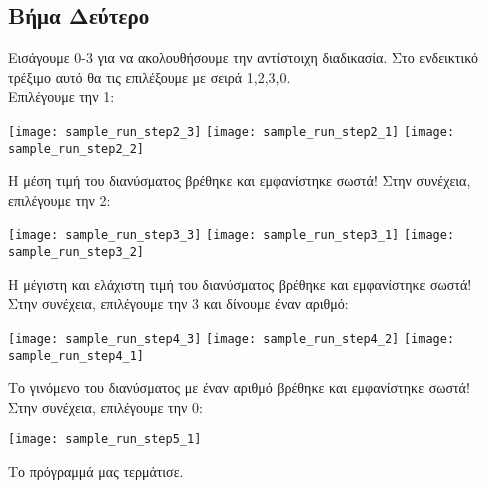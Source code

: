 \subsection{Βήμα Δεύτερο}
Εισάγουμε 0-3 για να ακολουθήσουμε την αντίστοιχη διαδικασία.
Στο ενδεικτικό τρέξιμο αυτό θα τις επιλέξουμε με σειρά 1,2,3,0.
\\
Επιλέγουμε την 1:
\begin{center}
\texttt{[image: sample\_run\_step2\_3]}
\texttt{[image: sample\_run\_step2\_1]}
\texttt{[image: sample\_run\_step2\_2]}
\end{center}
Η μέση τιμή του διανύσματος βρέθηκε και εμφανίστηκε σωστά!
Στην συνέχεια, επιλέγουμε την 2:
\begin{center}
\texttt{[image: sample\_run\_step3\_3]}
\texttt{[image: sample\_run\_step3\_1]}
\texttt{[image: sample\_run\_step3\_2]}
\end{center}
Η μέγιστη και ελάχιστη τιμή του διανύσματος βρέθηκε και εμφανίστηκε σωστά!
\\
Στην συνέχεια, επιλέγουμε την 3 και δίνουμε έναν αριθμό:
\begin{center}
\texttt{[image: sample\_run\_step4\_3]}
\texttt{[image: sample\_run\_step4\_2]}
\texttt{[image: sample\_run\_step4\_1]}
\end{center}
Το γινόμενο του διανύσματος με έναν αριθμό βρέθηκε και εμφανίστηκε σωστά!
\\
Στην συνέχεια, επιλέγουμε την 0:
\begin{center}
\texttt{[image: sample\_run\_step5\_1]}
\end{center}
Το πρόγραμμά μας τερμάτισε.
